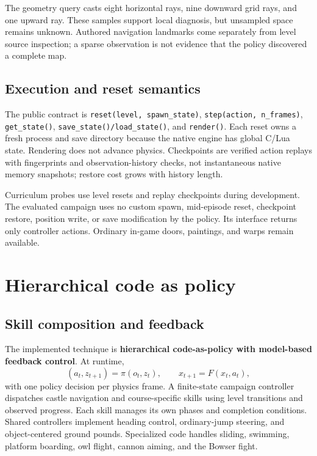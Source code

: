 \documentclass[10pt,letterpaper]{article}
\newcommand{\code}[1]{\texttt{#1}}
\begin{document}
The geometry query casts eight horizontal rays, nine downward grid rays, and one upward ray. These samples support local diagnosis, but unsampled space remains unknown. Authored navigation landmarks come separately from level source inspection; a sparse observation is not evidence that the policy discovered a complete map.

\subsection{Execution and reset semantics}
The public contract is \code{reset(level, spawn\_state)}, \code{step(action, n\_frames)}, \code{get\_state()}, \code{save\_state()/load\_state()}, and \code{render()}. Each reset owns a fresh process and save directory because the native engine has global C/Lua state. Rendering does not advance physics. Checkpoints are verified action replays with fingerprints and observation-history checks, not instantaneous native memory snapshots; restore cost grows with history length.

Curriculum probes use level resets and replay checkpoints during development. The evaluated campaign uses no custom spawn, mid-episode reset, checkpoint restore, position write, or save modification by the policy. Its interface returns only controller actions. Ordinary in-game doors, paintings, and warps remain available.

\clearpage
\section{Hierarchical code as policy}
\subsection{Skill composition and feedback}
The implemented technique is \textbf{hierarchical code-as-policy with model-based feedback control}. At runtime,
\begin{equation}
 (a_t,z_{t+1})=\pi(o_t,z_t), \qquad x_{t+1}=F(x_t,a_t),
\end{equation}
with one policy decision per physics frame. A finite-state campaign controller dispatches castle navigation and course-specific skills using level transitions and observed progress. Each skill manages its own phases and completion conditions. Shared controllers implement heading control, ordinary-jump steering, and object-centered ground pounds. Specialized code handles sliding, swimming, platform boarding, owl flight, cannon aiming, and the Bowser fight.
\end{document}

